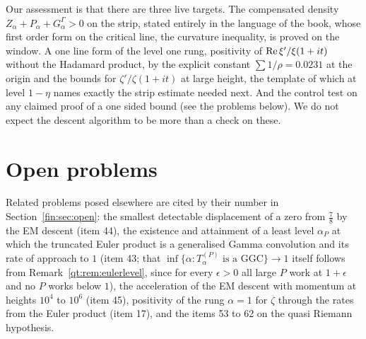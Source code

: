 Our assessment is that there are three live targets. The compensated density $Z_\alpha+P_\alpha+G^\Gamma_\alpha>0$ on the strip, stated entirely in the language of the book, whose first order form on the critical line, the curvature inequality, is proved on the window. A one line form of the level one rung, positivity of $\operatorname{Re}\xi'/\xi(1+it)$ without the Hadamard product, by the explicit constant $\sum1/\rho=0.0231$ at the origin and the bounds for $\zeta'/\zeta(1+it)$ at large height, the template of which at level $1-\eta$ names exactly the strip estimate needed next. And the control test on any claimed proof of a one sided bound (see the problems below). We do not expect the descent algorithm to be more than a check on these.

\section{Open problems}\label{qt:sec:open}

Related problems posed elsewhere are cited by their number in Section~\ref{fin:sec:open}: the smallest detectable displacement of a zero from $\frac78$ by the EM descent (item 44), the existence and attainment of a least level $\alpha_P$ at which the truncated Euler product is a generalised Gamma convolution and its rate of approach to $1$ (item 43; that $\inf\{\alpha:T^{(P)}_\alpha\text{ is a GGC}\}\to1$ itself follows from Remark~\ref{qt:rem:eulerlevel}, since for every $\epsilon>0$ all large $P$ work at $1+\epsilon$ and no $P$ works below $1$), the acceleration of the EM descent with momentum at heights $10^4$ to $10^6$ (item 45), positivity of the rung $\alpha=1$ for $\zeta$ through the rates from the Euler product (item 17), and the items 53 to 62 on the quasi Riemann hypothesis.

